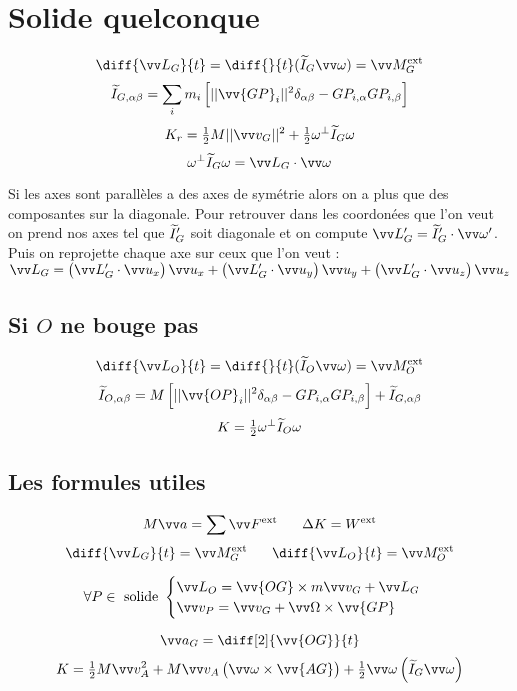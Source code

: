 \documentclass[../main.tex]{subfiles}
\begin{document}
\section{Solide quelconque}
\[
  \diff{\mc_G}{t}=\diff{}{t}(\widetilde{I}_G\vian)=\mf_G^{\exte}
\]
\[
  \ti_{G,\alpha\beta}=\sum_im_i\left[||\vv{GP}_i||^2\delta_{\alpha\beta} - GP_{i,\alpha}GP_{i,\beta}\right]
\]
\[
  K_r = \tfrac{1}{2}M||\vi_G||^2 + \tfrac{1}{2}\omega^{\bot}\ti_G\omega
\]
\[
  \omega^{\bot}\ti_G\omega=\mc_G\cdot\vian
\]

Si les axes sont parallèles a des axes de symétrie alors on a plus que des composantes sur la diagonale. Pour retrouver dans les coordonées que l'on veut on prend nos axes tel que \(\widetilde{I}_G'\) soit diagonale et on compute \(\mc_G'=\ti_G'\cdot\vian'\). Puis on reprojette chaque axe sur ceux que l'on veut : \(\mc_G=\left(\mc_G'\cdot\ux\right)\ux + \left(\mc_G'\cdot\uy\right)\uy + \left(\mc_G'\cdot\uz\right)\uz\)

\subsection{Si \(O\) ne bouge pas}
\[
  \diff{\mc_O}{t}=\diff{}{t}(\widetilde{I}_O\vian)=\mf_O^{\exte}
\]
\[
  \ti_{O,\alpha\beta}=M\left[||\vv{OP}_i||^2\delta_{\alpha\beta} - GP_{i,\alpha}GP_{i,\beta}\right] + \ti_{G,\alpha\beta}
\]
\[
  K =\tfrac{1}{2}\omega^{\bot}\widetilde{I}_O\omega
\]
\subsection{Les formules utiles}
\[
  M\ac = \sum\F^{\exte} \phantom{text} \Delta K = W^{\exte}
\]
\[
  \diff{\mc_G}{t}=\mf_G^{\exte} \phantom{text} \diff{\mc_O}{t}=\mf_O^{\exte}
\]

\[ \forall P\in \text{ solide } 
  \begin{cases}
    \mc_O = \vv{OG}\times m\vi_G + \mc_G \\
    \vi_P = \vi_G + \Vian\times\vv{GP}
  \end{cases}
\]

\[
  \ac_G = \diff[2]{\vv{OG}}{t}
\]
\[
  K = \tfrac{1}{2}M\vi_A^2 + M\vi_A\left(\vian\times\vv{AG}\right) + \tfrac{1}{2}\vian\left(\ti_G\vian\right)
\]
\end{document}
